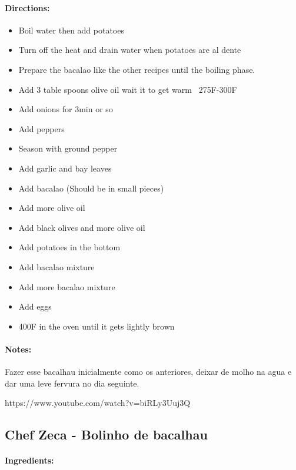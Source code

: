 \documentclass{article}
\begin{document}
\paragraph{Directions:}
\begin{itemize}
	\item Boil water then add potatoes
	\item Turn off the heat and drain water when potatoes are al dente
	\item Prepare the bacalao like the other recipes until the boiling phase.
	\item Add 3 table spoons olive oil wait it to get warm ~275F-300F
	\item Add onions for 3min or so
	\item Add peppers
	\item Season with ground pepper
	\item Add garlic and bay leaves
	\item Add bacalao (Should be in small pieces)
	\item Add more olive oil
	\item Add black olives and more olive oil
	\item Add potatoes in the bottom
	\item Add bacalao mixture
	\item Add more bacalao mixture
	\item Add eggs
	\item 400F in the oven until it gets lightly brown
\end{itemize}

\paragraph{Notes:}

Fazer esse bacalhau inicialmente como os anteriores, deixar de molho na agua e dar uma leve fervura no dia seguinte.

https://www.youtube.com/watch?v=biRLy3Uuj3Q

\subsection{Chef Zeca - Bolinho de bacalhau}

\paragraph{Ingredients:}
\end{document}
